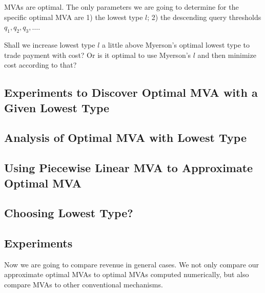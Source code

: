 \begin{corollary}

MVAs are optimal. The only parameters we are going to determine for the
specific optimal MVA are 1) the lowest type $l$; 2) the descending query
thresholds $q_1, q_2, q_3, \ldots$.

Shall we increase lowest type $l$ a little above Myerson's optimal lowest type
to trade payment with cost? Or is it optimal to use Myerson's $l$ and then
minimize cost according to that?

\end{corollary}

\subsection{Experiments to Discover Optimal MVA with a Given Lowest Type}

\subsection{Analysis of Optimal MVA with Lowest Type}

\subsection{Using Piecewise Linear MVA to Approximate Optimal MVA}

\subsection{Choosing Lowest Type?}

\subsection{Experiments}

Now we are going to compare revenue in general cases. We not only compare our
approximate optimal MVAs to optimal MVAs computed numerically, but also compare
MVAs to other conventional mechanisms.


